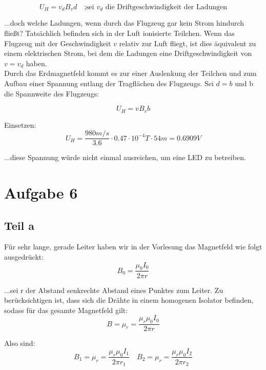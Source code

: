 \documentclass[a4paper,german,12pt,smallheadings]{scrartcl}
\begin{document}
\begin{equation*}
U_H=v_dB_vd \quad \text{;sei $v_d$ die Driftgeschwindigkeit der Ladungen}
\end{equation*}

...doch welche Ladungen, wenn durch das Flugzeug gar kein Strom hindurch fließt? Tatsächlich befinden sich in der Luft ionisierte Teilchen. Wenn das Flugzeug mit der Geschwindigkeit $v$ relativ zur Luft fliegt, ist dies äquivalent zu einem elektrischen Strom, bei dem die Ladungen eine Driftgeschwindigkeit von $v=v_d$ haben. \\

Durch das Erdmagnetfeld kommt es zur einer Auslenkung der Teilchen und zum Aufbau einer Spannung entlang der Tragflächen des Flugzeugs. Sei $d=b$ und b die Spannweite des Flugzeugs:

\begin{equation*}
U_H=vB_vb
\end{equation*}

Einsetzen:
\begin{equation*}
U_H=\frac{980m/s}{3.6}\cdot 0.47 \cdot 10^{-4}T \cdot 54m =0.6909V
\end{equation*}

...diese Spannung würde nicht einmal ausreichen, um eine LED zu betreiben.

\section*{Aufgabe 6}
\subsection *{Teil a}

Für sehr lange, gerade Leiter haben wir in der Vorlesung das Magnetfeld wie folgt ausgedrückt:
\begin{equation*}
B_0=\frac{\mu_0 I_0}{2\pi r}
\end{equation*}

...sei r der Abstand senkrechte Abstand eines Punktes zum Leiter. Zu berücksichtigen ist, dass sich die Drähte in einem homogenen Isolator befinden, sodass für das gesamte Magnetfeld gilt:
\begin{equation*}
B=\mu_r  = \frac{\mu_r \mu_0 I_0}{2\pi r}
\end{equation*}

Also sind:
\begin{equation*}
B_1=\mu_r  = \frac{\mu_r \mu_0 I_1}{2\pi r_1} \quad B_2=\mu_r  = \frac{\mu_r \mu_0 I_2}{2\pi r_2}
\end{equation*}
\end{document}
